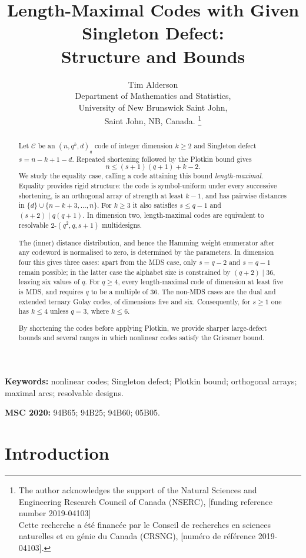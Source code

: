 \documentclass[12pt, letterpaper]{article}
\title{Length-Maximal Codes with Given Singleton Defect:\\ Structure and Bounds}
\author{Tim Alderson\\Department of Mathematics and Statistics,\\ University of New Brunswick Saint John, \\ Saint John, NB, Canada. \thanks{The author acknowledges the support of the Natural Sciences and Engineering Research Council of Canada (NSERC), [funding reference number 2019-04103]\\
			Cette recherche a \'{e}t\'{e} financ\'{e}e par le Conseil de recherches en sciences naturelles et en g\'{e}nie du Canada (CRSNG), [num\'{e}ro de r\'{e}f\'{e}rence 2019-04103].} }
\theoremstyle{plain}
\theoremstyle{definition}
\begin{document}
	
	\maketitle

\begin{abstract}
	Let $\mathcal C$ be an $(n,q^k,d)_q$ code of integer dimension $k\ge2$ and Singleton defect $s=n-k+1-d$. Repeated shortening followed by the Plotkin bound gives
	\[
	 n\le (s+1)(q+1)+k-2.
	\]
	We study the equality case, calling a code attaining this bound \emph{length-maximal}. Equality provides rigid structure: the code is symbol-uniform under every successive shortening, is an orthogonal array of strength at least $k-1$, and has pairwise distances in $\{d\}\cup\{n-k+3,\ldots,n\}$. For $k\ge3$ it also satisfies $s\le q-1$ and $(s+2)\mid q(q+1)$. In dimension two, length-maximal codes are equivalent to resolvable $2$-$(q^2,q,s+1)$ multidesigns.

	The (inner) distance distribution, and hence the Hamming weight enumerator after any codeword is normalised to zero, is determined by the parameters. In dimension four this gives three cases: apart from the MDS case, only $s=q-2$ and $s=q-1$ remain possible; in the latter case the alphabet size is constrained by $(q+2)\mid36$, leaving six values of $q$. For $q\ge4$, every length-maximal code of dimension at least five is MDS, and requires $q$ to be a multiple of $36$. The non-MDS cases are the dual and extended ternary Golay codes, of dimensions five and six. Consequently, for $s\ge1$ one has $k\le4$ unless $q=3$, where $k\le6$.

	By shortening the codes before applying Plotkin, we provide sharper large-defect bounds and several ranges in which nonlinear codes satisfy the Griesmer bound.
\end{abstract}

\medskip

	\noindent\textbf{Keywords:} nonlinear codes; Singleton defect; Plotkin bound; orthogonal arrays; maximal arcs; resolvable designs.

\smallskip

\noindent\textbf{MSC 2020:} 94B65; 94B25; 94B60; 05B05.

	\newpage
	\section{Introduction}
	
\end{document}
